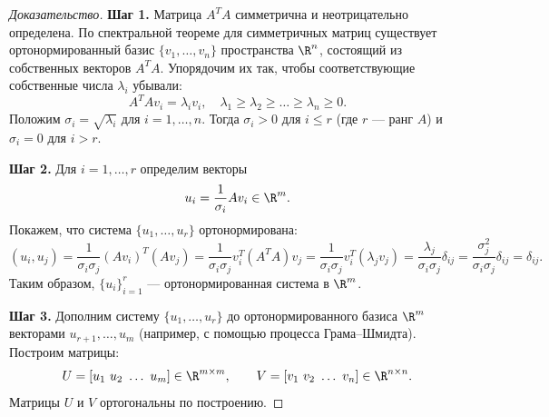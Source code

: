 \documentclass[10pt]{article}
\begin{document}
\begin{proof}[Доказательство]
    \textbf{Шаг 1.} Матрица $A^T A$ симметрична и неотрицательно определена. По спектральной теореме для симметричных матриц существует ортонормированный базис $\{v_1,\dots,v_n\}$ пространства $\R^n$, состоящий из собственных векторов $A^TA$. Упорядочим их так, чтобы соответствующие собственные числа $\lambda_i$ убывали:
    \[
    A^TA v_i = \lambda_i v_i, \quad \lambda_1 \ge \lambda_2 \ge \dots \ge \lambda_n \ge 0.
    \]
    Положим $\sigma_i = \sqrt{\lambda_i}$ для $i=1,\dots,n$. Тогда $\sigma_i>0$ для $i\le r$ (где $r$ — ранг $A$) и $\sigma_i=0$ для $i>r$.

    \textbf{Шаг 2.} Для $i=1,\dots,r$ определим векторы
    \[
    u_i = \frac{1}{\sigma_i} A v_i \in \R^m.
    \]
    Покажем, что система $\{u_1,\dots,u_r\}$ ортонормирована:
    \[
    (u_i, u_j) = \frac{1}{\sigma_i\sigma_j} (A v_i)^T (A v_j) = \frac{1}{\sigma_i\sigma_j} v_i^T (A^T A) v_j = \frac{1}{\sigma_i\sigma_j} v_i^T (\lambda_j v_j) = \frac{\lambda_j}{\sigma_i\sigma_j} \delta_{ij} = \frac{\sigma_j^2}{\sigma_i\sigma_j}\delta_{ij} = \delta_{ij}.
    \]
    Таким образом, $\{u_i\}_{i=1}^r$ — ортонормированная система в $\R^m$.

    \textbf{Шаг 3.} Дополним систему $\{u_1,\dots,u_r\}$ до ортонормированного базиса $\R^m$ векторами $u_{r+1},\dots,u_m$ (например, с помощью процесса Грама–Шмидта). Построим матрицы:
    \[
    U = [u_1\ u_2\ \dots\ u_m] \in \R^{m\times m},\qquad V = [v_1\ v_2\ \dots\ v_n] \in \R^{n\times n}.
    \]
    Матрицы $U$ и $V$ ортогональны по построению.


\end{proof}
\end{document}
